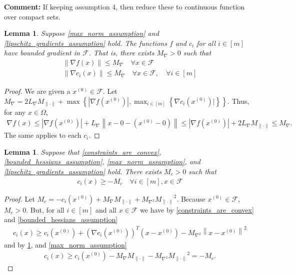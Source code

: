 \documentclass{article}
\newenvironment{comment}
  {\par\medskip
   \color{red}%
   \begin{framed}
   \textbf{Comment: }\ignorespaces}
 {\end{framed}
  \medskip}
\newtheorem{lemma}[theorem]{Lemma}
\theoremstyle{case}
\numberwithin{theorem}{subsection}
\newcommand{\feasible}{{\mathcal F}}
\newcommand{\gradf}{\nabla f}
\newcommand{\lipgrad}{{L_{\nabla}}}
\newcommand{\maxgrad}{{M_{\nabla}}}
\newcommand{\maxhessian}{{M_{\nabla^2}}}
\newcommand{\maxnorm}{{M_{\|\cdot\|}}}
\newcommand{\xinit}{{x^{(0)}}}
\begin{document}
\begin{comment}
If keeping assumption 4, then reduce these to continuous function over compact sets.
\end{comment}

\begin{lemma}
\label{bounded_gradients_lemma}
Suppose \cref{max_norm_assumption} and \cref{lipschitz_gradients_assumption} hold.
The functions $f$ and $c_i$ for all $ i \in [m]$ have bounded gradient in $ \feasible $.
That is, there exists $\maxgrad > 0$ such that
\begin{align}
\|\gradf(x)\| \le \maxgrad \quad  \forall x \in \feasible \\
\|\nabla c_i(x)\| \le \maxgrad \quad  \forall x \in \feasible, \quad \forall i \in [m]
\end{align}
\end{lemma}
\begin{proof}
We are given a $\xinit \in \feasible$. Let $\maxgrad = 2\lipgrad \maxnorm + \max\left\{|\gradf\left(\xinit\right)|, \max_{i \in [m]}\left\{\nabla c_i\left(\xinit\right)|\right\} \right\}$.
Thus, for any $x \in \Omega$,
\begin{align*}
\gradf(x) \le \left|\gradf\left(\xinit\right)\right| + \lipgrad \left\|x - 0 - \left(\xinit - 0\right)\right\| \le \left|\gradf\left(\xinit\right)\right| + 2\lipgrad \maxnorm \le \maxgrad.
\end{align*}
The same applies to each $c_i$.
\end{proof}


\begin{lemma}
\label{maximum_constraint_value_lemma}
Suppose that \cref{constraints_are_convex}, \cref{bounded_hessians_assumption}, \cref{max_norm_assumption}, and \cref{lipschitz_gradients_assumption} hold.
There exists $M_c>0$ such that
\begin{align*}
c_i(x) \ge -M_c \quad \forall i \in [m], x \in \feasible
\end{align*}
\end{lemma}
\begin{proof}
Let $M_c = -c_i\left(\xinit\right) + \maxgrad\maxnorm + \maxhessian \maxnorm^2$.
Because $\xinit \in\feasible$, $M_c > 0$.
But, for all $i \in [m]$ and all $x \in \feasible$ we have by 
\cref{constraints_are_convex} and \cref{bounded_hessians_assumption}
\begin{align*}
c_i(x) \ge c_i\left(\xinit\right) + \left(\nabla c_i\left(\xinit\right)\right)^T\left(x - \xinit\right) - \maxhessian \left\|x - \xinit\right\|^2
\end{align*}
and by \cref{bounded_gradients_lemma}, and \cref{max_norm_assumption}
\begin{align*}
c_i(x) \ge c_i\left(\xinit\right) - \maxgrad\maxnorm - \maxhessian \maxnorm^2 = -M_c.
\end{align*}
\end{proof}
\end{document}
